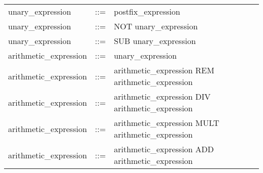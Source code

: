 \documentclass[11pt]{article}
\begin{document}
\begin{longtable}{lrl}
unary\_expression                          & ::= &
  \begin{minipage}[t]{\rulerhs}
    \raggedright
    postfix\_expression
  \end{minipage}                                                             \\
unary\_expression                          & ::= &
  \begin{minipage}[t]{\rulerhs}
    \raggedright
    NOT unary\_expression
  \end{minipage}                                                             \\
unary\_expression                          & ::= &
  \begin{minipage}[t]{\rulerhs}
    \raggedright
    SUB unary\_expression
  \end{minipage}                                                             \\
arithmetic\_expression                     & ::= &
  \begin{minipage}[t]{\rulerhs}
    \raggedright
    unary\_expression
  \end{minipage}                                                             \\
arithmetic\_expression                     & ::= &
  \begin{minipage}[t]{\rulerhs}
    \raggedright
    arithmetic\_expression REM arithmetic\_expression
  \end{minipage}                                                             \\
arithmetic\_expression                     & ::= &
  \begin{minipage}[t]{\rulerhs}
    \raggedright
    arithmetic\_expression DIV arithmetic\_expression
  \end{minipage}                                                             \\
arithmetic\_expression                     & ::= &
  \begin{minipage}[t]{\rulerhs}
    \raggedright
    arithmetic\_expression MULT arithmetic\_expression
  \end{minipage}                                                             \\
arithmetic\_expression                     & ::= &
  \begin{minipage}[t]{\rulerhs}
    \raggedright
    arithmetic\_expression ADD arithmetic\_expression
  \end{minipage}                                                             \\

\end{longtable}
\end{document}
